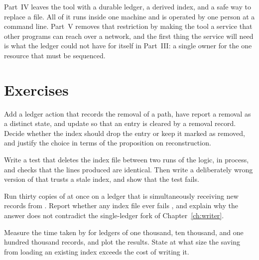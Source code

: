 Part~IV leaves the tool with a durable ledger, a derived index, and a safe way to replace a file. All of it runs inside one machine and is operated by one person at a command line. Part~V removes that restriction by making the tool a service that other programs can reach over a network, and the first thing the service will need is what the ledger could not have for itself in Part~III: a single owner for the one resource that must be sequenced.

\section*{Exercises}

\begin{exercise}
Add a ledger action that records the removal of a path, have  report a removal as a distinct state, and update  so that an entry is cleared by a removal record. Decide whether the index should drop the entry or keep it marked as removed, and justify the choice in terms of the proposition on reconstruction.
\end{exercise}

\begin{exercise}
Write a test that deletes the index file between two runs of the  logic, in process, and checks that the lines produced are identical. Then write a deliberately wrong version of  that trusts a stale index, and show that the test fails.
\end{exercise}

\begin{exercise}
Run thirty copies of  at once on a ledger that is simultaneously receiving new records from . Report whether any index file ever fails , and explain why the answer does not contradict the single-ledger fork of Chapter~\ref{ch:writer}.
\end{exercise}

\begin{exercise}
Measure the time taken by  for ledgers of one thousand, ten thousand, and one hundred thousand records, and plot the results. State at what size the saving from loading an existing index exceeds the cost of writing it.
\end{exercise}
